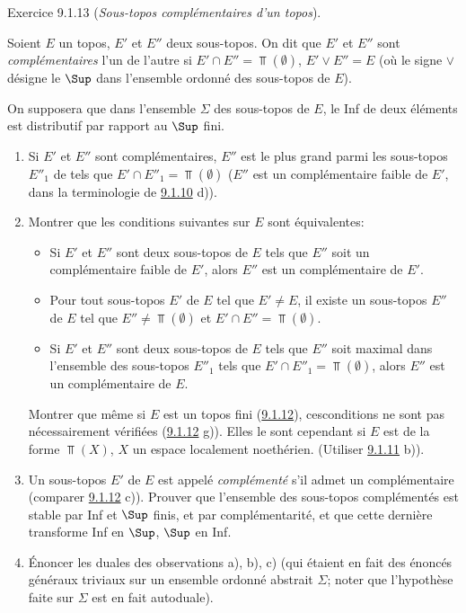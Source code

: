 \documentclass[10pt]{../fichiers-configuration-latex/smfart}
\begin{document}
\begin{enonce*}[remark]{Exercice 9.1.13}
(\emph{Sous-topos complémentaires d'un topos}).

Soient $E$ un topos, $E'$ et $E''$ deux sous-topos. On dit que $E'$
et $E''$ sont \emph{complémentaires} l'un de l'autre si $E'\cap
E''=\Top(∅)$, $E'\vee E''=E$ (où le signe $\vee$ désigne le
$\Sup$ dans l'ensemble ordonné des sous-topos de $E$).

On supposera que dans l'ensemble $\Sigma$ des sous-topos de $E$, le
Inf de deux éléments est distributif par rapport au $\Sup$ fini.

\begin{enumerate}
\renewcommand{\theenumi}{\alph{enumi}}
\renewcommand{\labelenumi}{\theenumi)}
\item Si $E'$ et $E''$ sont complémentaires, $E''$ est le plus grand
parmi les sous-topos $E''_1$ de tels que $E'\cap E''_1=\Top(∅)$
(\ie $E''$ est un complémentaire faible de $E'$, dans la
terminologie de \hyperref[IV.exer9.1.10]{9.1.10} d)).

\item Montrer que les conditions suivantes sur $E$ sont équivalentes:
\begin{itemize}
\item[(i)] Si $E'$ et $E''$ sont deux sous-topos de $E$ tels que $E''$
soit un complémentaire faible de $E'$, alors $E''$ est un
complémentaire de $E'$.

\item[(ii)] Pour tout sous-topos $E'$ de $E$ tel que $E'\neq E$, il
existe un sous-topos $E''$ de $E$ tel que $E''\neq \Top(∅)$ et
$E'\cap E''=\Top(∅)$.

\item[(i bis)] Si $E'$ et $E''$ sont deux sous-topos de $E$ tels que
$E''$ soit maximal dans l'ensemble des sous-topos $E''_1$ tels que
$E'\cap E''_1=\Top(∅)$, alors $E''$ est un complémentaire de $E$.
\end{itemize}

Montrer que même si $E$ est un topos fini (\hyperref[IV.exer9.1.12]{9.1.12}),
ces\pageoriginale conditions ne sont pas nécessairement vérifiées
(\hyperref[IV.exer9.1.12]{9.1.12} g)). Elles le sont cependant si $E$ est de la
forme $\Top(X)$, $X$ un espace localement noethérien. (Utiliser
\hyperref[IV.exer9.1.11]{9.1.11} b)).

\item Un sous-topos $E'$ de $E$ est appelé \emph{complémenté} s'il
admet un complémentaire (comparer \hyperref[IV.exer9.1.12]{9.1.12} c)). Prouver
que l'ensemble des sous-topos complémentés est stable par Inf et
$\Sup$ finis, et par complémentarité, et que cette dernière
transforme Inf en $\Sup$, $\Sup$ en Inf.

\item Énoncer les duales des observations a), b), c) (qui étaient en
fait des énoncés généraux triviaux sur un ensemble ordonné abstrait
$\Sigma$; noter que l'hypothèse faite sur $\Sigma$ est en fait
autoduale).
\end{enumerate}
\end{enonce*}
\end{document}
